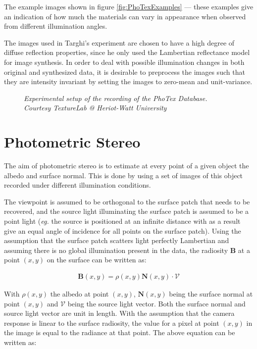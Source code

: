 The example images shown in figure \ref{fig:PhoTexExamples} --- these examples give an indication of how much the materials can vary in appearance when observed from different illumination angles.

The images used in Targhi's experiment are chosen to have a high degree of diffuse reflection properties, since he only used the Lambertian reflectance model for image synthesis. In order to deal with possible illumination changes in both original and synthesized data, it is desirable to preprocess the images such that they are intensity invariant by setting the images to zero-mean and unit-variance. 

\begin{figure}[htbp!]
	\begin{center}
	\end{center}
	\caption{{ \it Experimental setup of the recording of the PhoTex Database. Courtesy TextureLab @ Heriot-Watt University}}
	\label{fig:PHOTEX_SETUP}
\end{figure}

\section{Photometric Stereo}\label{sec:PhotometricStereo}
The aim of photometric stereo is to estimate at every point of a given object the albedo and surface normal. This is done by using a set of images of this object recorded under different illumination conditions. 

The viewpoint is assumed to be orthogonal to the surface patch that needs to be recovered, and the source light illuminating the surface patch is assumed to be a point light (\textit{eg.} the source is positioned at an infinite distance with as a result give an equal angle of incidence for all points on the surface patch). Using the assumption that the surface patch scatters light perfectly Lambertian and assuming there is no global illumination present in the data, the radiosity \textbf{B} at a point $(x, y)$ on the surface can be written as:

	\begin{eqnarray*}
		\textbf{B}(x,y) = \rho(x,y)\textbf{N}(x,y) \cdot \mathcal{V}
	\end{eqnarray*}

\noindent With $\rho(x,y)$ the albedo at point $(x,y)$, $\textbf{N}(x,y)$ being the surface normal at point $(x,y)$ and $\mathcal{V}$ being the source light vector. Both the surface normal and source light vector are unit in length. With the assumption that the camera response is linear to the surface radiosity, the value for a pixel at point $(x,y)$ in the image is equal to the radiance at that point. The above equation can be written as:

